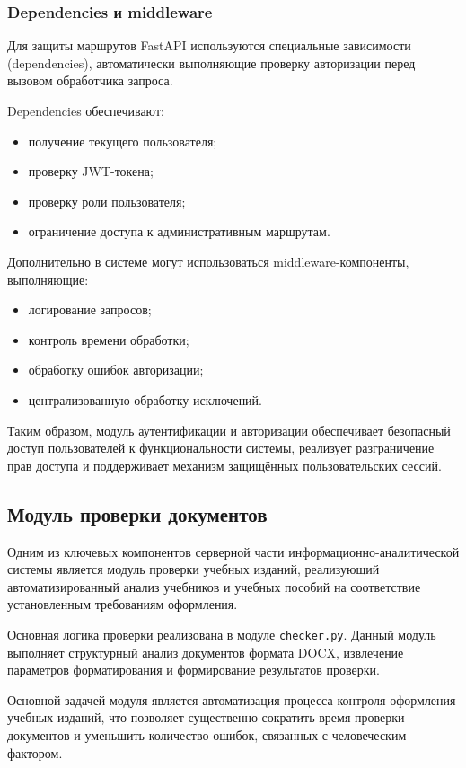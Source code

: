 \subsubsection{Dependencies и middleware}

Для защиты маршрутов FastAPI используются специальные зависимости (dependencies), автоматически выполняющие проверку авторизации перед вызовом обработчика запроса.

Dependencies обеспечивают:
\begin{itemize}
	\item получение текущего пользователя;
	\item проверку JWT-токена;
	\item проверку роли пользователя;
	\item ограничение доступа к административным маршрутам.
\end{itemize}

Дополнительно в системе могут использоваться middleware-компоненты, выполняющие:
\begin{itemize}
	\item логирование запросов;
	\item контроль времени обработки;
	\item обработку ошибок авторизации;
	\item централизованную обработку исключений.
\end{itemize}

Таким образом, модуль аутентификации и авторизации обеспечивает безопасный доступ пользователей к функциональности системы, реализует разграничение прав доступа и поддерживает механизм защищённых пользовательских сессий.

\subsection{Модуль проверки документов}

Одним из ключевых компонентов серверной части информационно-аналитической системы является модуль проверки учебных изданий, реализующий автоматизированный анализ учебников и учебных пособий на соответствие установленным требованиям оформления.

Основная логика проверки реализована в модуле \texttt{checker.py}. Данный модуль выполняет структурный анализ документов формата DOCX, извлечение параметров форматирования и формирование результатов проверки.

Основной задачей модуля является автоматизация процесса контроля оформления учебных изданий, что позволяет существенно сократить время проверки документов и уменьшить количество ошибок, связанных с человеческим фактором.

